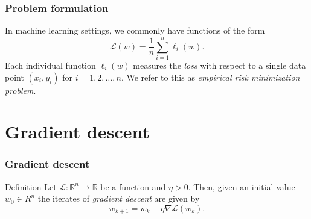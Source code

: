 \documentclass[17pt,institute=e10]{tuhh_presentation}
\newcommand{\R}{\mathbb{R}}
\newcommand{\Lo}{\mathcal{L} : \R^n \rightarrow \R}
\newcommand{\CL}{\mathcal{L}}
\begin{document}
\begin{frame}
  \frametitle{Problem formulation}
  In machine learning settings, we commonly have functions of the form
  \begin{equation*}
    \CL(w) = \frac{1}{n} \sum_{i=1}^n \ell_i(w).
  \end{equation*}
  Each individual function $\ell_i(w)$ measures the \emph{loss} with respect to a single data point $(x_i, y_i)$ for $i = 1,2, \dots, n$.
  We refer to this as \emph{empirical risk minimization problem}.
\end{frame}

\section{Gradient descent}

\begin{frame}[fragile]
  \frametitle{Gradient descent}

  \begin{block}{Definition}
    Let $\Lo$ be a function and $\eta > 0$. Then, given an initial value $w_0 \in R^n$ the iterates of \emph{gradient descent} are given by
  \begin{equation*}
    w_{k+1} = w_k - \eta \nabla \CL(w_k).
  \end{equation*}
  \end{block}

\end{frame}
\end{document}

